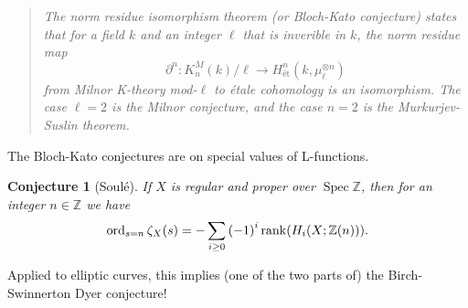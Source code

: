 \documentclass[leqno, openany]{memoir}
\newtheorem{conj}[thm]{Conjecture}
\theoremstyle{definition}
\theoremstyle{remark}
\theoremstyle{plain}
\theoremstyle{definition}
\theoremstyle{remark}
\newcommand{\Z}{\mathbb{Z}}
\DeclareMathOperator{\Spec}{Spec}
\begin{document}
\begin{quotation} \textit{The norm residue isomorphism theorem (or Bloch-Kato
        conjecture) states that for a field $k$ and an integer $\ell$ that is
        inverible in $k$, the norm residue map \[ \partial^n \colon
        K_n^M(k)/\ell \to H_{\text{\'et}}^n(k, \mu_{\ell}^{\otimes n}) \] from
    Milnor K-theory mod-$\ell$ to \'etale cohomology is an isomorphism. The
case $\ell=2$ is the Milnor conjecture, and the case $n=2$ is the
Murkurjev-Suslin theorem.} \end{quotation}


The Bloch-Kato conjectures are on special values of L-functions.
\begin{conj}[Soul\'e] If $X$ is regular and proper over $\Spec \Z$, then for an
    integer $n \in \Z$ we have \[ \operatorname{ord}_{s=n} \zeta_X(s) = -
    \sum_{i \geq 0} {(-1)}^i \rank (H_i(X; \Z(n))). \] \end{conj}


Applied to elliptic curves, this implies (one of the two parts of) the
Birch-Swinnerton Dyer conjecture!
\end{document}
